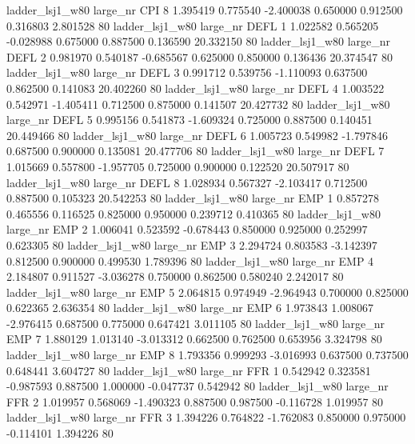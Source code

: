     ladder_lsj1_w80   large_nr      CPI                 8  1.395419  0.775540  -2.400038 0.650000 0.912500  0.316803    2.801528 80
    ladder_lsj1_w80   large_nr     DEFL                 1  1.022582  0.565205  -0.028988 0.675000 0.887500  0.136590   20.332150 80
    ladder_lsj1_w80   large_nr     DEFL                 2  0.981970  0.540187  -0.685567 0.625000 0.850000  0.136436   20.374547 80
    ladder_lsj1_w80   large_nr     DEFL                 3  0.991712  0.539756  -1.110093 0.637500 0.862500  0.141083   20.402260 80
    ladder_lsj1_w80   large_nr     DEFL                 4  1.003522  0.542971  -1.405411 0.712500 0.875000  0.141507   20.427732 80
    ladder_lsj1_w80   large_nr     DEFL                 5  0.995156  0.541873  -1.609324 0.725000 0.887500  0.140451   20.449466 80
    ladder_lsj1_w80   large_nr     DEFL                 6  1.005723  0.549982  -1.797846 0.687500 0.900000  0.135081   20.477706 80
    ladder_lsj1_w80   large_nr     DEFL                 7  1.015669  0.557800  -1.957705 0.725000 0.900000  0.122520   20.507917 80
    ladder_lsj1_w80   large_nr     DEFL                 8  1.028934  0.567327  -2.103417 0.712500 0.887500  0.105323   20.542253 80
    ladder_lsj1_w80   large_nr      EMP                 1  0.857278  0.465556   0.116525 0.825000 0.950000  0.239712    0.410365 80
    ladder_lsj1_w80   large_nr      EMP                 2  1.006041  0.523592  -0.678443 0.850000 0.925000  0.252997    0.623305 80
    ladder_lsj1_w80   large_nr      EMP                 3  2.294724  0.803583  -3.142397 0.812500 0.900000  0.499530    1.789396 80
    ladder_lsj1_w80   large_nr      EMP                 4  2.184807  0.911527  -3.036278 0.750000 0.862500  0.580240    2.242017 80
    ladder_lsj1_w80   large_nr      EMP                 5  2.064815  0.974949  -2.964943 0.700000 0.825000  0.622365    2.636354 80
    ladder_lsj1_w80   large_nr      EMP                 6  1.973843  1.008067  -2.976415 0.687500 0.775000  0.647421    3.011105 80
    ladder_lsj1_w80   large_nr      EMP                 7  1.880129  1.013140  -3.013312 0.662500 0.762500  0.653956    3.324798 80
    ladder_lsj1_w80   large_nr      EMP                 8  1.793356  0.999293  -3.016993 0.637500 0.737500  0.648441    3.604727 80
    ladder_lsj1_w80   large_nr      FFR                 1  0.542942  0.323581  -0.987593 0.887500 1.000000 -0.047737    0.542942 80
    ladder_lsj1_w80   large_nr      FFR                 2  1.019957  0.568069  -1.490323 0.887500 0.987500 -0.116728    1.019957 80
    ladder_lsj1_w80   large_nr      FFR                 3  1.394226  0.764822  -1.762083 0.850000 0.975000 -0.114101    1.394226 80
